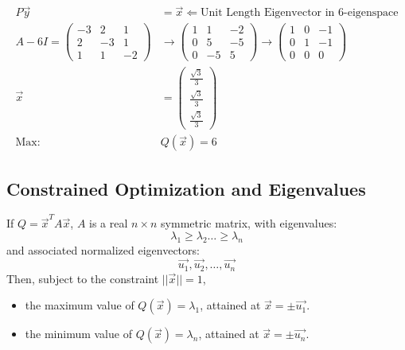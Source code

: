 \begin{align}
    P \Vec{y} &= \Vec{x} \Leftarrow \text{Unit Length Eigenvector in 6-eigenspace} \\
    A-6I = \begin{pmatrix}
        -3 & 2 & 1 \\ 2 & -3 & 1 \\ 1 & 1 & -2
    \end{pmatrix}
    &\rightarrow \begin{pmatrix}
        1 & 1 & -2 \\ 0 & 5 & -5 \\ 0 & -5 & 5
    \end{pmatrix} \rightarrow \begin{pmatrix}
        1 & 0 & -1 \\ 0 & 1 & -1 \\ 0 & 0 & 0
    \end{pmatrix} \\
    \Vec{x} &= \begin{pmatrix}
        \frac{\sqrt{3}}{3} \\ \frac{\sqrt{3}}{3} \\ \frac{\sqrt{3}}{3}
    \end{pmatrix} \\
    \text{Max: }& Q(\Vec{x}) = 6
\end{align}

\subsection{Constrained Optimization and Eigenvalues}
\begin{theorem}
    If \(Q = \Vec{x}^T A \Vec{x}\), \(A\) is a real \(n\times n\) symmetric matrix, with eigenvalues:
    \[\lambda_1 \ge \lambda_2 \dots \ge \lambda_n\]
    and associated normalized eigenvectors:
    \[\Vec{u_1},\Vec{u_2},\dots,\Vec{u_n}\]
    Then, subject to the constraint \(||\Vec{x}|| = 1\),
    \begin{itemize}
        \item the maximum value of \(Q(\Vec{x}) = \lambda_1\), attained at \(\Vec{x}=\pm \Vec{u_1}\).
        \item the minimum value of \(Q(\Vec{x}) = \lambda_n\), attained at \(\Vec{x}=\pm \Vec{u_n}\).
    \end{itemize}
\end{theorem}